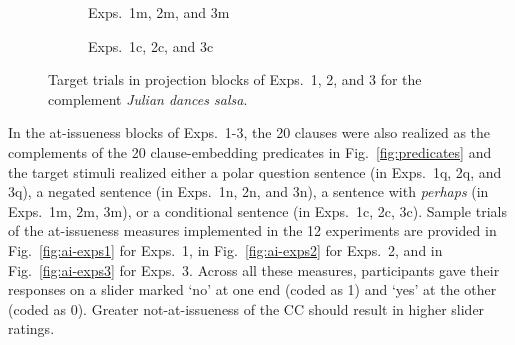\documentclass[11pt,fleqn]{article}
\newcommand{\6}{\mbox{$[\hspace*{-.6mm}[$}}
\newcommand{\9}{\mbox{$]\hspace*{-.6mm}]$}}
\begin{document}
\begin{figure}[h!]
\begin{subfigure}[t]{0.5\textwidth}
\caption{Exps.~1m, 2m, and 3m}\label{fig-exp1m-projection}
 \end{subfigure}%
\begin{subfigure}[t]{0.5\textwidth}
\centering
{} 
\caption{Exps.~1c, 2c, and 3c}\label{fig-exp1c-projection}
\end{subfigure}
\caption{Target trials in projection blocks of Exps.~1, 2, and 3 for the complement {\em Julian dances salsa}.}\label{fig:projection-trials}
\end{figure}

In the at-issueness blocks of Exps.~1-3, the 20 clauses were also realized as the complements of the 20 clause-embedding predicates in Fig.~\ref{fig:predicates} and the target stimuli realized either a polar question sentence (in Exps.~1q, 2q, and 3q), a negated sentence (in Exps.~1n, 2n, and 3n), a sentence with {\em perhaps} (in Exps.~1m, 2m, 3m), or a conditional sentence (in Exps.~1c, 2c, 3c). Sample trials of the at-issueness measures implemented in the 12 experiments are provided in Fig.~\ref{fig:ai-exps1} for Exps.~1, in Fig.~\ref{fig:ai-exps2} for Exps.~2, and in Fig.~\ref{fig:ai-exps3} for Exps.~3. Across all these measures, participants gave their responses on a slider marked `no' at one end (coded as 1) and `yes' at the other (coded as 0). Greater not-at-issueness of the CC should result in higher slider ratings.
\end{document}
